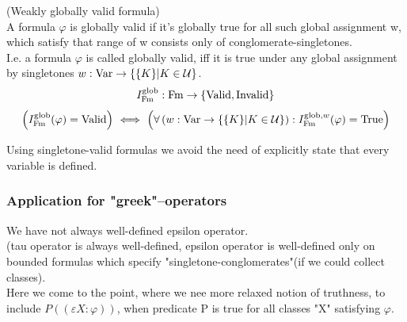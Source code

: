 \begin{definition}(Weakly globally valid formula)\\
A formula $\varphi$ is globally valid if it's globally true for all such global assignment w, which satisfy that range of w consists only of conglomerate-singletones.\\
I.e. a formula $\varphi$ is called globally valid, iff it is true under any global assignment by singletones $w:\mathrm{Var}\to\{\{K\}|K\in\mathcal{U}\}$.
\[
I^{\mathrm{glob}}_{\mathrm{Fm}} : \mathrm{Fm} \to \{\mathrm{Valid},\mathrm{Invalid}\}
\]
\[
\left(I^{\mathrm{glob}}_{\mathrm{Fm}}(\varphi)=\mathrm{Valid}\right) \ \Longleftrightarrow\ 
 \left(\forall \left(w:\mathrm{Var}\to\{\{K\}|K\in\mathcal{U}\}\right):I^{\mathrm{glob},w}_{\mathrm{Fm}}(\varphi)=\mathrm{True}\right)
\]
\end{definition}
Using singletone-valid formulas we avoid the need of explicitly state that every variable is defined.

\subsubsection{Application for "greek"--operators}

We have not always well-defined epsilon operator.\\
(tau operator is always well-defined, epsilon operator is well-defined only on bounded formulas which specify "singletone-conglomerates"(if we could collect classes).\\

Here we come to the point, where we nee more relaxed notion of truthness, to include $P((\varepsilon X: \varphi))$, when predicate P is true for all classes "X" satisfying $\varphi$.

